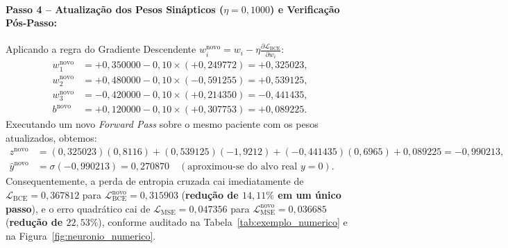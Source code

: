 ﻿\documentclass[runningheads]{llncs}
\begin{document}
\paragraph{Passo 4 -- Atualiza\c{c}\~{a}o dos Pesos Sin\'{a}pticos ($\eta = 0{,}1000$) e Verifica\c{c}\~{a}o P\'{o}s-Passo:}
Aplicando a regra do Gradiente Descendente $w_i^{\text{novo}} = w_i - \eta \frac{\partial \mathcal{L}_{\text{BCE}}}{\partial w_i}$:
\begin{align}
    w_1^{\text{novo}} &= +0{,}350000 - 0{,}10 \times (+0{,}249772) = +0{,}325023, \nonumber\\
    w_2^{\text{novo}} &= +0{,}480000 - 0{,}10 \times (-0{,}591255) = +0{,}539125, \nonumber\\
    w_3^{\text{novo}} &= -0{,}420000 - 0{,}10 \times (+0{,}214350) = -0{,}441435, \nonumber\\
    b^{\text{novo}}   &= +0{,}120000 - 0{,}10 \times (+0{,}307753) = +0{,}089225.
\end{align}
Executando um novo \textit{Forward Pass} sobre o mesmo paciente com os pesos atualizados, obtemos:
\begin{align}
    z^{\text{novo}} &= (0{,}325023)(0{,}8116) + (0{,}539125)(-1{,}9212) + (-0{,}441435)(0{,}6965) + 0{,}089225 = -0{,}990213, \nonumber\\
    \hat{y}^{\text{novo}} &= \sigma(-0{,}990213) = 0{,}270870 \quad (\text{aproximou-se do alvo real } y = 0).
\end{align}
Consequentemente, a perda de entropia cruzada cai imediatamente de $\mathcal{L}_{\text{BCE}} = 0{,}367812$ para $\mathcal{L}_{\text{BCE}}^{\text{novo}} = 0{,}315903$ (\textbf{redu\c{c}\~{a}o de $14{,}11\%$ em um \'{u}nico passo}), e o erro quadr\'{a}tico cai de $\mathcal{L}_{\text{MSE}} = 0{,}047356$ para $\mathcal{L}_{\text{MSE}}^{\text{novo}} = 0{,}036685$ (\textbf{redu\c{c}\~{a}o de $22{,}53\%$}), conforme auditado na Tabela~\ref{tab:exemplo_numerico} e na Figura~\ref{fig:neuronio_numerico}.
\end{document}
